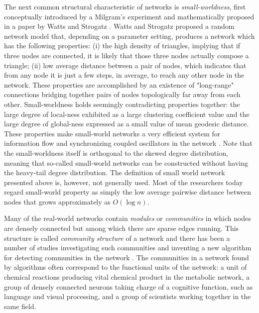 \documentclass[..]{revtex4}
\begin{document}
	The next common structural characteristic of networks is \textit{small-worldness}, first conceptually introduced by a Milgram's experiment \cite{Milgram} and mathematically proposed in a paper by Watts and Strogatz \cite{watts1998cds}. Watts and Strogatz proposed a random network model that, depending on a parameter setting, produces a network which has the following properties: (i) the high density of triangles, implying that if three nodes are connected, it is likely that those three nodes actually compose a triangle; (ii) low average distance between a pair of nodes, which indicates that from any node it is just a few steps, in average, to reach any other node in the network. These properties are accomplished by an existence of "long-range" connections bridging together pairs of nodes topologically far away from each other. Small-worldness holds seemingly contradicting properties together: the large degree of local-ness exhibited as a large clustering coefficient value and the large degree of global-ness expressed as a small value of mean geodesic distance.  These properties make small-world networks a very efficient system for information flow \cite{SmallWorldEfficiency} and synchronizing coupled oscillators in the network \cite{SmallWorldSynchronization}. Note that the small-worldness itself is orthogonal to the skewed degree distribution, meaning that so-called small-world networks can be constructed without having the heavy-tail degree distribution. The definition of small world network presented above is, however, not generally used. Most of the researchers today regard small-world property as simply the low average pairwise distance between nodes that grows approximately as $O(\log n)$.
	
	
	Many of the real-world networks contain \textit{modules} or \textit{communities} in which nodes are densely connected but among which there are sparse edges running. This structure is called \textit{community structure} of a network and there has been a number of studies investigating such communities and inventing a new algorithm for detecting communities in the network \cite{Modularity1, Modularity2, ModularityReview}. The communities in a network found by algorithms often correspond to the functional units of the network: a unit of chemical reactions producing vital chemical product in the metabolic network, a group of densely connected neurons taking charge of a cognitive function, such as language and visual processing, and a group of scientists working together in the same field.
	
\end{document}
